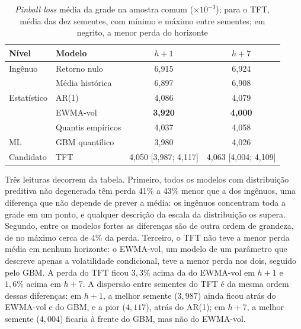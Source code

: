 \begin{table}[htb]
\centering
\caption[\textit{Pinball loss} média da grade na amostra comum]{\textit{Pinball loss} média da grade na amostra comum (\(\times 10^{-3}\)); para o TFT, média das dez sementes, com mínimo e máximo entre sementes; em negrito, a menor perda do horizonte}
\label{tab:h2-perdas}
\small
\begin{tabular}{l l c c}
\toprule
Nível & Modelo & \(h+1\) & \(h+7\) \\
\midrule
Ingênuo & Retorno nulo & 6,915 & 6,924 \\
 & Média histórica & 6,897 & 6,908 \\
\midrule
Estatístico & AR(1) & 4,086 & 4,079 \\
 & EWMA-vol & \textbf{3,920} & \textbf{4,000} \\
 & Quantis empíricos & 4,037 & 4,058 \\
\midrule
ML & GBM quantílico & 3,980 & 4,026 \\
\midrule
Candidato & TFT & 4,050 [3,987; 4,117] & 4,063 [4,004; 4,109] \\
\bottomrule
\end{tabular}
\end{table}

Três leituras decorrem da tabela. Primeiro, todos os modelos com distribuição preditiva não degenerada têm perda 41\% a 43\% menor que a dos ingênuos, uma diferença que não depende de prever a média: os ingênuos concentram toda a grade em um ponto, e qualquer descrição da escala da distribuição os supera. Segundo, entre os modelos fortes as diferenças são de outra ordem de grandeza, de no máximo cerca de 4\% da perda. Terceiro, o TFT não teve a menor perda média em nenhum horizonte: o EWMA-vol, um modelo de um parâmetro que descreve apenas a volatilidade condicional, teve a menor perda nos dois, seguido pelo GBM. A perda do TFT ficou \(3{,}3\%\) acima da do EWMA-vol em \(h+1\) e \(1{,}6\%\) acima em \(h+7\). A dispersão entre sementes do TFT é da mesma ordem dessas diferenças: em \(h+1\), a melhor semente (\(3{,}987\)) ainda ficou atrás do EWMA-vol e do GBM, e a pior (\(4{,}117\)), atrás do AR(1); em \(h+7\), a melhor semente (\(4{,}004\)) ficaria à frente do GBM, mas não do EWMA-vol.

